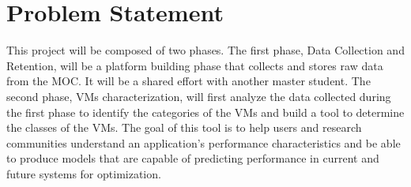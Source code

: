 \section{Problem Statement}
\label{sec:ProblemStatement}

%

This project will be composed of two phases. The first phase, Data Collection and Retention, will be a platform building phase that collects and stores raw data from the MOC. It will be a shared effort with another master student. The second phase, VMs characterization, will first analyze the data collected during the first phase to identify the categories of the VMs and build a tool to determine the classes of the VMs. The goal of this tool is to help users and research communities understand an application’s performance characteristics and be able to produce models that are capable of predicting performance in current and future systems for optimization.





